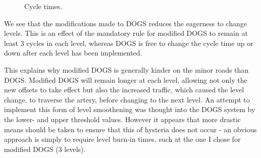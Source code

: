 \begin{figure}[htbp]
\caption{Cycle times.}
\label{fig:dogs_cycle_times}
\end{figure}

We see that the modifications made to DOGS reduces the eagerness to change levels. This is an effect of the mandatory rule for modified DOGS to remain at least 3 cycles in each level, whereas DOGS is free to change the cycle time up or down after each level has been implemented. 

This explains why modified DOGS is generally kinder on the minor roads than DOGS. Modified DOGS will remain longer at each level, allowing not only the new offsets to take effect but also the increased traffic, which caused the level change, to traverse the artery, before changing to the next level. An attempt to implement this form of level smoothening was thought into the DOGS system by the lower- and upper threshold values. However it appears that more drastic means should be taken to ensure that this of hysteria does not occur - an obvious approach is simply to require level burn-in times, such at the one I chose for modified DOGS (3 levels).

